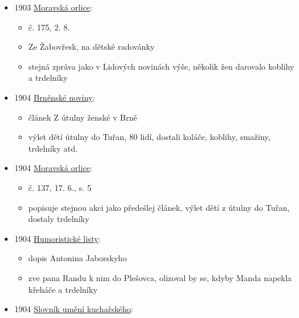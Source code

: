 \begin{itemize}
  \begin{itemize}
  \tightlist
  \item
    s. 252, 3. 11., s. 3
  \item
    \emph{Na vinobraní Spolku stravovacího a ferial. osad}
  \item
    paní Jelenová darovala trdelníky
  \end{itemize}
\item
  1903
  \href{https://www.digitalniknihovna.cz/mzk/uuid/uuid:47b7ba20-09c3-11df-86d0-000d606f5dc6}{Moravská
  orlice}:

  \begin{itemize}
  \tightlist
  \item
    č. 175, 2. 8.
  \item
    Ze Žabovřesk, na dětské radovánky
  \item
    stejná zpráva jako v Lidových novinách výše, několik žen darovalo
    koblihy a trdelníky
  \end{itemize}
\item
  1904
  \href{https://ceskadigitalniknihovna.cz/view/uuid:62df2c30-8367-11e3-a606-005056827e51?page=uuid\%3A3bd12fb0-86e3-11e3-b6b2-005056822549&fulltext=trdeln\%C3\%ADk\%20OR\%20trdeln\%C3\%ADky\%20OR\%20trdeln\%C3\%ADk\%C5\%AF&source=mzk}{Brněnské
  noviny}:

  \begin{itemize}
  \tightlist
  \item
    článek Z útulny ženské v Brně
  \item
    výlet dětí útulny do Tuřan, 80 lidí, dostali koláče, koblihy,
    smažiny, trdelníky atd.
  \end{itemize}
\item
  1904
  \href{https://www.digitalniknihovna.cz/mzk/uuid/uuid:407275a0-0b4b-11df-aa42-000d606f5dc6}{Moravská
  orlice}:

  \begin{itemize}
  \tightlist
  \item
    č. 137, 17. 6., s. 5
  \item
    popisuje stejnou akci jako předešlej článek, výlet dětí z útulny do
    Tuřan, dostaly trdelníky
  \end{itemize}
\item
  1904
  \href{https://ceskadigitalniknihovna.cz/uuid/uuid:e6cbfaf4-435d-11dd-b505-00145e5790ea}{Humoristické
  listy}:

  \begin{itemize}
  \tightlist
  \item
    dopis Antonina Jaborskyho
  \item
    zve pana Randu k nim do Plešovca, olizoval by se, kdyby Manda
    napekla křeháče a trdelníky
  \end{itemize}
\item
  1904
  \href{https://ceskadigitalniknihovna.cz/view/uuid:245714d0-e323-11ec-a26a-5ef3fc9bb22f?page=uuid\%3Acacf7f15-f1a5-4cca-a344-05b1ee66b972&fulltext=trdlovec&source=nkp}{Slovník
  umění kuchařského}:


\end{itemize}
